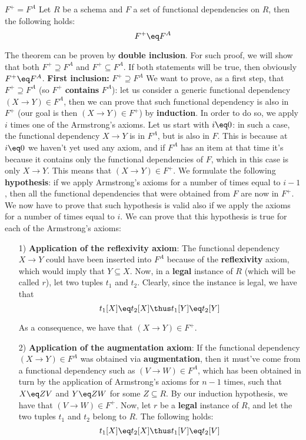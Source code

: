 \begin{theorem}{$F^+ = F^A$}
    Let $R$ be a schema and $F$ a set of functional dependencies on $R$, then the following holds:
    \[ F^+ \eq F^A \]
    \vspace{12pt}
\end{theorem}
\begin{longproof}
    The theorem can be proven by \textbf{double inclusion}. For such proof, we will show that both $F^+ \supseteq F^A$ and $F^+ \subseteq F^A$. If both statements will be true, then obviously $F^+ \eq F^A$.
    \nwl
    \textbf{First inclusion:} $F^+ \supseteq F^A$
    \nwl
    We want to prove, as a first step, that $F^+ \supseteq F^A$ (so $F^+$ \textbf{contains} $F^A$): let us consider a generic functional dependency $(X \rightarrow Y) \in F^A$, then we can prove that such functional dependency is also in $F^+$ (our goal is then $(X \rightarrow Y) \in F^+$) by \textbf{induction}. In order to do so, we apply $i$ times one of the Armstrong's axioms.
    \nwl
    Let us start with $i \eq 0$: in such a case, the functional dependency $X \rightarrow Y$ is in $F^A$, but is also in $F$. This is because at $i \eq 0$ we haven't yet used any axiom, and if $F^A$ has an item at that time it's because it contains only the functional dependencies of $F$, which in this case is only $X \rightarrow Y$. This means that $(X \rightarrow Y) \in F^+$.
    \nwl
    We formulate the following \textbf{hypothesis}: if we apply Armstrong's axioms for a number of times equal to $i - 1$, then all the functional dependencies that were obtained from $F$ are now in $F^+$. We now have to prove that such hypothesis is valid also if we apply the axioms for a number of times equal to $i$. We can prove that this hypothesis is true for each of the Armstrong's axioms:
    \begin{itemize}
        \item [1)] \textbf{Application of the reflexivity axiom}:\nwl
        The functional dependency $X \rightarrow Y$ could have been inserted into $F^A$ because of the \textbf{reflexivity} axiom, which would imply that $Y \subseteq X$. Now, in a \textbf{legal} instance of $R$ (which will be called $r$), let two tuples $t_1$ and $t_2$. Clearly, since the instance is legal, we have that
        \[ t_1[X] \eq t_2[X] \thus t_1[Y] \eq t_2[Y] \]

        As a consequence, we have that $(X \rightarrow Y) \in F^+$.
        \\
        \item [2)] \textbf{Application of the augmentation axiom}:\nwl
        If the functional dependency $(X \rightarrow Y) \in F^A$ was obtained via \textbf{augmentation}, then it must've come from a functional dependency such as $(V \rightarrow W) \in F^A$, which has been obtained in turn by the application of Armstrong's axioms for $n - 1$ times, such that $X \eq ZV$ and $Y \eq ZW$ for some $Z \subseteq R$. By our induction hypothesis, we have that $(V \rightarrow W) \in F^+$. Now, let $r$ be a \textbf{legal} instance of $R$, and let the two tuples $t_1$ and $t_2$ belong to $R$. The following holds:
        \[ t_1[X] \eq t_2[X] \thus t_1[V] \eq t_2[V] \]
        

\end{itemize}
\end{longproof}
